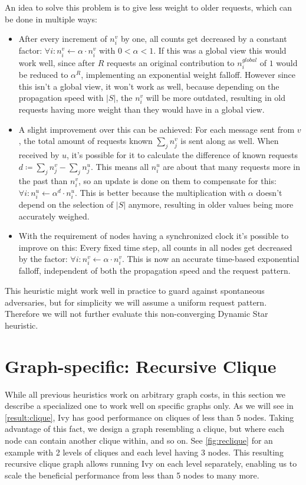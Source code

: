 \documentclass[a4paper, oneside]{discothesis}
\begin{document}
An idea to solve this problem is to give less weight to older requests, which can be done in multiple ways:
\begin{itemize}
\item After every increment of $n_i^v$ by one, all counts get decreased by a constant factor: $\forall i:n_i^v\gets \alpha\cdot n_i^v$ with $0<\alpha<1$. If this was a global view this would work well, since after $R$ requests an original contribution to $n_i^{global}$ of $1$ would be reduced to $\alpha^R$, implementing an exponential weight falloff. However since this isn't a global view, it won't work as well, because depending on the propagation speed with $|S|$, the $n_i^v$ will be more outdated, resulting in old requests having more weight than they would have in a global view.
\item A slight improvement over this can be achieved: For each message sent from $v$, the total amount of requests known $\sum_jn_j^v$ is sent along as well. When received by $u$, it's possible for it to calculate the difference of known requests $d\coloneqq\sum_jn_j^v-\sum_jn_j^u$. This means all $n_i^u$ are about that many requests more in the past than $n_i^v$, so an update is done on them to compensate for this: $\forall i:n_i^u\gets\alpha^d\cdot n_i^u$. This is better because the multiplication with $\alpha$ doesn't depend on the selection of $|S|$ anymore, resulting in older values being more accurately weighed.
\item With the requirement of nodes having a synchronized clock it's possible to improve on this: Every fixed time step, all counts in all nodes get decreased by the factor: $\forall i:n_i^v\gets \alpha\cdot n_i^v$. This is now an accurate time-based exponential falloff, independent of both the propagation speed and the request pattern.
\end{itemize}

This heuristic might work well in practice to guard against spontaneous adversaries, but for simplicity we will assume a uniform request pattern. Therefore we will not further evaluate this non-converging Dynamic Star heuristic.

\section{Graph-specific: Recursive Clique}
\label{alg:reclique}

While all previous heuristics work on arbitrary graph costs, in this section we describe a specialized one to work well on specific graphs only. As we will see in \autoref{result:clique}, Ivy has good performance on cliques of less than 5 nodes. Taking advantage of this fact, we design a graph resembling a clique, but where each node can contain another clique within, and so on. See \autoref{fig:reclique} for an example with 2 levels of cliques and each level having 3 nodes. This resulting recursive clique graph allows running Ivy on each level separately, enabling us to scale the beneficial performance from less than 5 nodes to many more.
\end{document}
